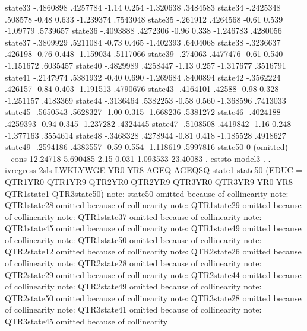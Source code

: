      state33 {\VBAR}  -.4860898   .4257784    -1.14   0.254    -1.320638    .3484583
     state34 {\VBAR}  -.2425348    .508578    -0.48   0.633    -1.239374    .7543048
     state35 {\VBAR}   -.261912   .4264568    -0.61   0.539     -1.09779    .5739657
     state36 {\VBAR}  -.4093888   .4272306    -0.96   0.338    -1.246783    .4280056
     state37 {\VBAR}  -.3809929   .5211084    -0.73   0.465    -1.402393    .6404068
     state38 {\VBAR}  -.3236637    .426198    -0.76   0.448    -1.159034    .5117066
     state39 {\VBAR}   -.274063   .4477476    -0.61   0.540    -1.151672    .6035457
     state40 {\VBAR}  -.4829989   .4258447    -1.13   0.257    -1.317677    .3516791
     state41 {\VBAR}  -.2147974   .5381932    -0.40   0.690    -1.269684    .8400894
     state42 {\VBAR}  -.3562224    .426157    -0.84   0.403    -1.191513    .4790676
     state43 {\VBAR}  -.4164101     .42588    -0.98   0.328    -1.251157    .4183369
     state44 {\VBAR}  -.3136464   .5382253    -0.58   0.560    -1.368596    .7413033
     state45 {\VBAR}  -.5650543   .5628327    -1.00   0.315    -1.668236    .5381272
     state46 {\VBAR}  -.4024188   .4259393    -0.94   0.345    -1.237282    .4324445
     state47 {\VBAR}  -.5108508   .4419842    -1.16   0.248    -1.377163    .3554614
     state48 {\VBAR}  -.3468328   .4278944    -0.81   0.418    -1.185528    .4918627
     state49 {\VBAR}  -.2594186   .4383557    -0.59   0.554    -1.118619    .5997816
     state50 {\VBAR}          0  (omitted)
       _cons {\VBAR}   12.24718   5.690485     2.15   0.031     1.093533    23.40083
{\smallskip}
. eststo model3
{\smallskip}
. 
. ivregress 2sls LWKLYWGE YR0-YR8 AGEQ AGEQSQ state1-state50 (EDUC = QTR1YR0-QTR1YR9 QTR2YR0-QTR2YR9 QTR3YR0-QTR3YR9 YR0-YR8 QTR1state1-QTR3state50)
note: state50 omitted because of collinearity
note: QTR1state28 omitted because of collinearity
note: QTR1state29 omitted because of collinearity
note: QTR1state37 omitted because of collinearity
note: QTR1state45 omitted because of collinearity
note: QTR1state49 omitted because of collinearity
note: QTR1state50 omitted because of collinearity
note: QTR2state12 omitted because of collinearity
note: QTR2state26 omitted because of collinearity
note: QTR2state28 omitted because of collinearity
note: QTR2state29 omitted because of collinearity
note: QTR2state44 omitted because of collinearity
note: QTR2state49 omitted because of collinearity
note: QTR2state50 omitted because of collinearity
note: QTR3state28 omitted because of collinearity
note: QTR3state41 omitted because of collinearity
note: QTR3state45 omitted because of collinearity
